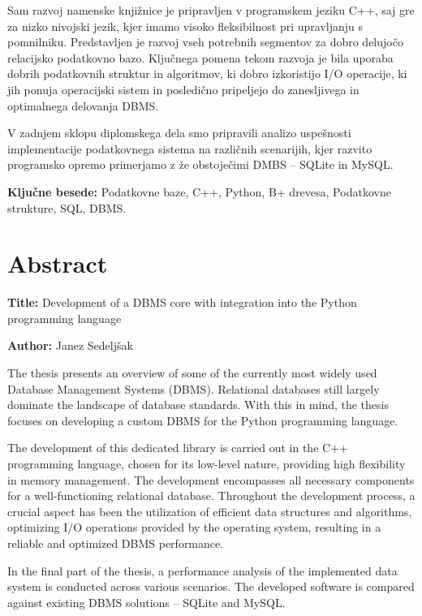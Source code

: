 \documentclass[a4paper,12pt,openright]{book}
\newcommand{\ttitleEn}{Development of a DBMS core with integration into the Python programming language}
\newcommand{\tauthor}{Janez Sedeljšak}
\newcommand{\tkeywords}{Podatkovne baze, C++, Python, B+ drevesa, Podatkovne strukture, SQL, DBMS}
\newcommand{\clearemptydoublepage}{\newpage{\pagestyle{empty}\cleardoublepage}}
\begin{document}
Sam razvoj namenske knjižnice je pripravljen v programskem jeziku C++, saj gre za nizko nivojski jezik, kjer imamo visoko fleksibilnost pri upravljanju s pomnilniku. Predstavljen je razvoj vseh potrebnih segmentov za dobro delujočo relacijsko podatkovno bazo. Ključnega pomena tekom razvoja je bila uporaba dobrih podatkovnih struktur in algoritmov, ki dobro izkoristijo I/O operacije, ki jih ponuja operacijski sistem in posledično pripeljejo do zanesljivega in optimalnega delovanja DBMS.

V zadnjem sklopu diplomskega dela smo pripravili analizo uspešnosti implementacije podatkovnega sistema na različnih scenarijih, kjer razvito programsko opremo primerjamo z že obstoječimi DMBS – SQLite in MySQL.
\bigskip

\noindent\textbf{Ključne besede:} \tkeywords.
\clearemptydoublepage

{}
\chapter*{Abstract}

\noindent\textbf{Title:} \ttitleEn
\bigskip

\noindent\textbf{Author:} \tauthor
\bigskip

\noindent The thesis presents an overview of some of the currently most widely used Database Management Systems (DBMS). Relational databases still largely dominate the landscape of database standards. With this in mind, the thesis focuses on developing a custom DBMS for the Python programming language.

The development of this dedicated library is carried out in the C++ programming language, chosen for its low-level nature, providing high flexibility in memory management. The development encompasses all necessary components for a well-functioning relational database. Throughout the development process, a crucial aspect has been the utilization of efficient data structures and algorithms, optimizing I/O operations provided by the operating system, resulting in a reliable and optimized DBMS performance.

In the final part of the thesis, a performance analysis of the implemented data system is conducted across various scenarios. The developed software is compared against existing DBMS solutions – SQLite and MySQL.
\bigskip
\end{document}
